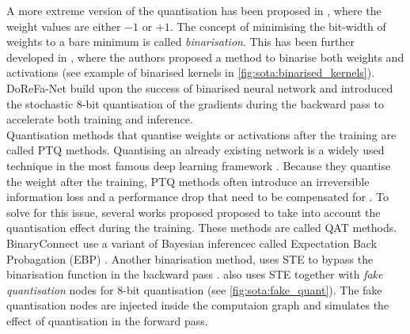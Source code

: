 A more extreme version of the quantisation has been proposed in
\cite{courbariaux2015binaryconnect}, where the weight values are either $-1$ or
$+1$. The concept of minimising the bit-width of weights to a bare minimum is
called \emph{binarisation}. This has been further developed in
\cite{DBLP:conf/nips/HubaraCSEB16}, where the authors proposed a method to
binarise both weights and activations (see example of binarised kernels in
\cref{fig:sota:binarised_kernels}). DoReFa-Net \cite{zhou2016dorefa} build upon
the success of binarised neural network and introduced the stochastic 8-bit
quantisation of the gradients during the backward pass to accelerate both
training and inference.\\

Quantisation methods that quantise weights or activations after the training are
called \ac{PTQ} methods. Quantising an already existing network is a widely used
technique in the most famous deep learning framework
\cite{ncnn,qnnpack,snapdragon,tensorrt}. Because they quantise the weight after
the training, \ac{PTQ} methods often introduce an irreversible information loss
and  a performance drop that need to be compensated for
\cite{DBLP:journals/ijon/LiangGWSZ21}. To solve for this issue, several works
proposed proposed to take into account the quantisation effect during the
training. These methods are called \ac{QAT} methods. BinaryConnect
\cite{courbariaux2015binaryconnect} use a variant of Bayesian inferencec called
Expectation Back Probagation (EBP)
\cite{DBLP:journals/corr/ChengSML15,DBLP:conf/nips/SoudryHM14}. Another
binarisation method, uses \acl{STE} \cite{DBLP:journals/corr/BengioLC13} to
bypass the binarisation function in the backward pass
\cite{DBLP:conf/nips/HubaraCSEB16}. \cite{DBLP:conf/cvpr/JacobKCZTHAK18} also
uses \ac{STE} together with \emph{fake quantisation} nodes for 8-bit
quantisation (see \cref{fig:sota:fake_quant}). The fake quantisation nodes are
injected inside the computaion graph and simulates the effect of quantisation in
the forward pass.

